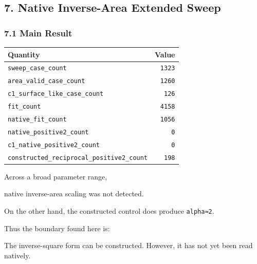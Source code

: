 \documentclass[
]{article}
\newenvironment{Shaded}{}{}
\newcommand{\NormalTok}[1]{#1}
\newcounter{none} %
\begin{document}
\subsection{7. Native Inverse-Area Extended
Sweep}\label{native-inverse-area-extended-sweep}

\subsubsection{7.1 Main Result}\label{main-result-5}

{\def\LTcaptype{none} %
\begin{longtable}[]{@{}lr@{}}
\toprule\noalign{}
Quantity & Value \\
\midrule\noalign{}
\endhead
\bottomrule\noalign{}
\endlastfoot
\texttt{sweep\_case\_count} & \texttt{1323} \\
\texttt{area\_valid\_case\_count} & \texttt{1260} \\
\texttt{c1\_surface\_like\_case\_count} & \texttt{126} \\
\texttt{fit\_count} & \texttt{4158} \\
\texttt{native\_fit\_count} & \texttt{1056} \\
\texttt{native\_positive2\_count} & \texttt{0} \\
\texttt{c1\_native\_positive2\_count} & \texttt{0} \\
\texttt{constructed\_reciprocal\_positive2\_count} & \texttt{198} \\
\end{longtable}
}

Across a broad parameter range,

\begin{Shaded}
\begin{Highlighting}[]
\NormalTok{native inverse{-}area scaling was not detected.}
\end{Highlighting}
\end{Shaded}

On the other hand, the constructed control does produce
\texttt{alpha≈2}.

Thus the boundary found here is:

\begin{Shaded}
\begin{Highlighting}[]
\NormalTok{The inverse{-}square form can be constructed.}
\NormalTok{However, it has not yet been read natively.}
\end{Highlighting}
\end{Shaded}
\end{document}

